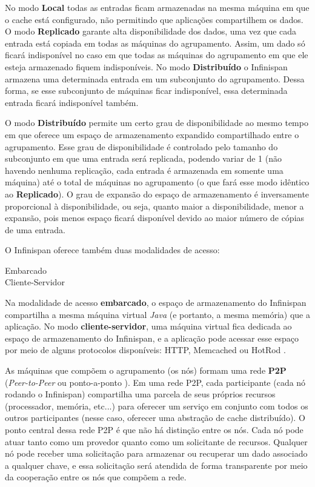 \documentclass[11pt,twoside,a4paper]{book}
\begin{document}
No modo \textbf{Local} todas as entradas ficam armazenadas na mesma máquina em que o cache está configurado, não permitindo que aplicações compartilhem os dados. O modo \textbf{Replicado} garante alta disponibilidade dos dados, uma vez que cada entrada está copiada em todas as máquinas do agrupamento. Assim, um dado só ficará indisponível no caso em que todas as máquinas do agrupamento em que ele esteja armazenado fiquem indisponíveis. No modo \textbf{Distribuído} o Infinispan armazena uma determinada entrada em um subconjunto do agrupamento. Dessa forma, se esse subconjunto de máquinas ficar indisponível, essa determinada entrada ficará indisponível também. 

O modo \textbf{Distribuído} permite um certo grau de disponibilidade ao mesmo tempo em que oferece um espaço de armazenamento expandido compartilhado entre o agrupamento. Esse grau de disponibilidade é controlado pelo tamanho do subconjunto em que uma entrada será replicada, podendo variar de 1 (não havendo nenhuma replicação, cada entrada é armazenada em somente uma máquina) até o total de máquinas no agrupamento (o que fará esse modo idêntico ao \textbf{Replicado}). O grau de expansão do espaço de armazenamento é inversamente proporcional à disponibilidade, ou seja, quanto maior a disponibilidade, menor a expansão, pois menos espaço ficará disponível devido ao maior número de cópias de uma entrada.

O Infinispan oferece também duas modalidades de acesso:

\begin{description}
	\item[Embarcado]
	\item[Cliente-Servidor] 
\end{description}

Na modalidade de acesso \textbf{embarcado}, o espaço de armazenamento do Infinispan compartilha a mesma máquina virtual \emph{Java} (e portanto, a mesma memória) que a aplicação. No modo \textbf{cliente-servidor}, uma máquina virtual fica dedicada ao espaço de armazenamento do Infinispan, e a aplicação pode acessar esse espaço por meio de alguns protocolos disponíveis: HTTP, Memcached ou HotRod \cite{infinispan}.

As máquinas que compõem o agrupamento (os nós) formam uma rede \textbf{P2P} (\emph{Peer-to-Peer} ou ponto-a-ponto \cite{p2p}). Em uma rede P2P, cada participante (cada nó rodando o Infinispan) compartilha uma parcela de seus próprios recursos (processador, memória, 
etc...) para oferecer um serviço em conjunto com todos os outros participantes (nesse caso, oferecer uma abstração de cache distribuído).
O ponto central dessa rede P2P é que não há distinção entre os nós. Cada nó pode atuar tanto como um provedor quanto como um solicitante de recursos. Qualquer nó pode receber uma solicitação para armazenar ou recuperar um dado associado a qualquer chave, e essa solicitação será atendida de forma transparente por meio da cooperação entre os nós que compõem a rede.
\end{document}

